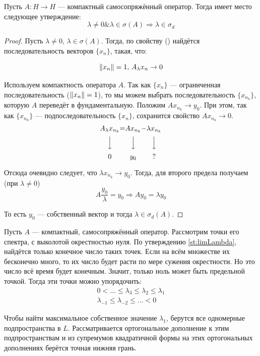 \documentclass[12pt]{article}
\begin{document}
	\begin{theorem}
		Пусть $A: H \rightarrow H$ --- компактный самосопряжённый оператор. Тогда имеет место следующее утверждение:
		$$\lambda \neq 0 \& \lambda \in \sigma(A) \Rightarrow \lambda \in \sigma_d $$
	\end{theorem}
	\begin{proof}
		Пусть $\lambda \neq 0,\, \lambda \in \sigma(A)$. Тогда, по свойству (\label{eq:specCrit}) найдётся последовательность 
		векторов $\{x_n\}$, такая, что:
		
		$$\left\| x_n \right\| = 1,\, A_{\lambda}x_n \rightarrow 0$$
		
		Используем компактность оператора $A$. Так как $\{x_n\}$ --- ограниченная последовательность ($\left\| x_n \right\| = 1$), то
		мы можем выбрать последовательность $\{x_{n_k}\}$, которую $A$ переведёт в фундаментальную. 
		Положим $Ax_{n_k}\rightarrow y_0$. При этом, так как $\{x_{n_k}\}$ --- подпоследовательность $\{x_{n}\}$, 
		сохранится свойство $Ax_{n_k} \rightarrow 0$.
		$$
		\begin{CD}
			A_{\lambda}x_{n_k} @.=@. Ax_{n_k} @.-@. \lambda x_{n_k} \\
			@VVV @. @VVV @. @VVV \\
			0 @.@. y_0 @.@. ?
		\end{CD}
		$$
		
		Отсюда очевидно следует, что $\lambda x_{n_k} \rightarrow y_0$. Тогда, для второго предела получаем (при $\lambda \neq 0$)
		$$A\dfrac{y_0}{\lambda} = y_0 \Rightarrow Ay_0 = \lambda y_0$$
		
		То есть $y_0$ --- собственный вектор и тогда $\lambda \in \sigma_d(A)$.
	\end{proof}
	
	Пусть $A$ --- компактный, самосопряжённый оператор. Рассмотрим точки его спектра, с выколотой окрестностью нуля. 
	По утверждению \ref{st:limLambda}, найдётся только конечное число таких точек. Если на всём множестве их бесконечно много, 
	то их число будет расти по мере сужения окрестности. Но это число всё время будет конечным. Значит, только ноль может быть
	предельной точкой. Тогда эти точки можно упорядочить:
	\begin{gather*}
		0 < \dots \leq \lambda_3 \leq \lambda_2 \leq \lambda_1 \\
		\lambda_{-1} \leq \lambda_{-2} \leq \dots < 0
	\end{gather*}
	
	{\color{gray}Чтобы найти максимальное собственное значение $\lambda_1$, берутся все одномерные подпространства в $L$. 
	Рассматривается ортогональное дополнение к этим подпространствам и из супремумов квадратичной формы на
	этих ортогональных дополнениях берётся точная нижняя грань.}
	
\end{document}
